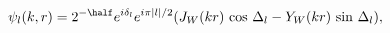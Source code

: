 \begin{equation}
\label{Eq_0304}
\psi_l(k,r) = 2^{-\half} e^{i\delta_l} e^{i\pi|l|/2}
  (J_W(kr) \, \cos \, \Delta_l - Y_W(kr) \, \sin \, \Delta_l),
\end{equation}

